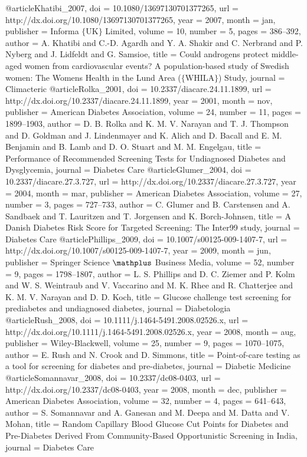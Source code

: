 @article{Khatibi_2007,
	doi = {10.1080/13697130701377265},
	url = {http://dx.doi.org/10.1080/13697130701377265},
	year = 2007,
	month = {jan},
	publisher = {Informa $\lbrace$UK$\rbrace$ Limited},
	volume = {10},
	number = {5},
	pages = {386--392},
	author = {A. Khatibi and C.-D. Agardh and Y. A. Shakir and C. Nerbrand and P. Nyberg and J. Lidfeldt and G. Samsioe},
	title = {Could androgens protect middle-aged women from cardiovascular events? A population-based study of Swedish women: The Women{\textquotesingle}s Health in the Lund Area ($\lbrace$WHILA$\rbrace$) Study},
	journal = {Climacteric}
}
@article{Rolka_2001,
	doi = {10.2337/diacare.24.11.1899},
	url = {http://dx.doi.org/10.2337/diacare.24.11.1899},
	year = 2001,
	month = {nov},
	publisher = {American Diabetes Association},
	volume = {24},
	number = {11},
	pages = {1899--1903},
	author = {D. B. Rolka and K. M. V. Narayan and T. J. Thompson and D. Goldman and J. Lindenmayer and K. Alich and D. Bacall and E. M. Benjamin and B. Lamb and D. O. Stuart and M. M. Engelgau},
	title = {Performance of Recommended Screening Tests for Undiagnosed Diabetes and Dysglycemia},
	journal = {Diabetes Care}
}
@article{Glumer_2004,
	doi = {10.2337/diacare.27.3.727},
	url = {http://dx.doi.org/10.2337/diacare.27.3.727},
	year = 2004,
	month = {mar},
	publisher = {American Diabetes Association},
	volume = {27},
	number = {3},
	pages = {727--733},
	author = {C. Glumer and B. Carstensen and A. Sandbaek and T. Lauritzen and T. Jorgensen and K. Borch-Johnsen},
	title = {A Danish Diabetes Risk Score for Targeted Screening: The Inter99 study},
	journal = {Diabetes Care}
}
@article{Phillips_2009,
	doi = {10.1007/s00125-009-1407-7},
	url = {http://dx.doi.org/10.1007/s00125-009-1407-7},
	year = 2009,
	month = {jun},
	publisher = {Springer Science $\mathplus$ Business Media},
	volume = {52},
	number = {9},
	pages = {1798--1807},
	author = {L. S. Phillips and D. C. Ziemer and P. Kolm and W. S. Weintraub and V. Vaccarino and M. K. Rhee and R. Chatterjee and K. M. V. Narayan and D. D. Koch},
	title = {Glucose challenge test screening for prediabetes and undiagnosed diabetes},
	journal = {Diabetologia}
}
@article{Rush_2008,
	doi = {10.1111/j.1464-5491.2008.02526.x},
	url = {http://dx.doi.org/10.1111/j.1464-5491.2008.02526.x},
	year = 2008,
	month = {aug},
	publisher = {Wiley-Blackwell},
	volume = {25},
	number = {9},
	pages = {1070--1075},
	author = {E. Rush and N. Crook and D. Simmons},
	title = {Point-of-care testing as a tool for screening for diabetes and pre-diabetes},
	journal = {Diabetic Medicine}
}
@article{Somannavar_2008,
	doi = {10.2337/dc08-0403},
	url = {http://dx.doi.org/10.2337/dc08-0403},
	year = 2008,
	month = {dec},
	publisher = {American Diabetes Association},
	volume = {32},
	number = {4},
	pages = {641--643},
	author = {S. Somannavar and A. Ganesan and M. Deepa and M. Datta and V. Mohan},
	title = {Random Capillary Blood Glucose Cut Points for Diabetes and Pre-Diabetes Derived From Community-Based Opportunistic Screening in India},
	journal = {Diabetes Care}
}
